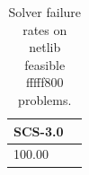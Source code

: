 \begin{table}
\caption{Solver failure rates on netlib feasible fffff800 problems.}
\label{t-netlib feasible fffff800-failure}
\begin{tabular}{lc}
\toprule
SCS-3.0 \\
\midrule
100.00 \\
\bottomrule
\end{tabular}
\end{table}
